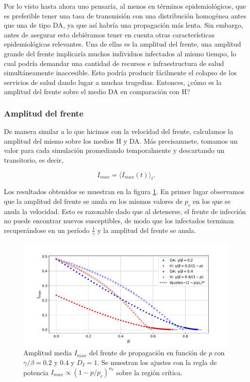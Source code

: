 Por lo visto hasta ahora uno pensaría, al menos en términos epidemiológicos, que es preferible tener una tasa de transmisión con una distribución homogénea antes que una de tipo DA, ya que así habría una propagación más lenta. Sin embargo, antes de asegurar esto debiéramos tener en cuenta otras características epidemiológicas relevantes. Una de ellas es la amplitud del frente, una amplitud grande del frente implicaría muchos individuos infectados al mismo tiempo, lo cual podría demandar una cantidad de recursos e infraestructura de salud simultáneamente inaccesible. Esto podría producir fácilmente el colapso de los servicios de salud dando lugar a muchas tragedias. 
Entonces, ¿cómo es la amplitud del frente sobre el medio DA en comparación con H?



\subsubsection*{Amplitud del frente}

De manera similar a lo que hicimos con la velocidad del frente, calculamos la amplitud del mismo sobre los medios H y DA. Más precisamnete, tomamos un valor para cada simulación promediando temporalmente y descartando un transitorio, es decir,

\begin{equation}
    I_{max} = \langle I_{max}(t) \rangle_{t}.
\end{equation}

Los resultados obtenidos se muestran en la figura \ref{fig:amplitud_p}. En primer lugar observamos que la amplitud del frente se anula en los mismos valores de $p_c$ en los que se anula la velocidad. Esto es razonable dado que al detenerse, el frente de infección no puede encontrar nuevos susceptibles, de modo que los infectados terminan recuperándose en un período $\frac{1}{\gamma}$ y la amplitud del frente se anula. 

\begin{figure}[!b]
    \centering
    \includegraphics[width=\imsizeL]{amplitud_p.pdf}
    \caption{Amplitud media $I_{max}$ del frente de propagación en función de $p$ con $\gamma/\beta=0.2$ y $0.4$ y $D_{I}=1$. Se muestran los 
    ajustes con la regla de potencia $I_{max}\propto(1-p/p_c)^{\alpha_I}$ sobre la región crítica.}
    \label{fig:amplitud_p}
 \end{figure}

